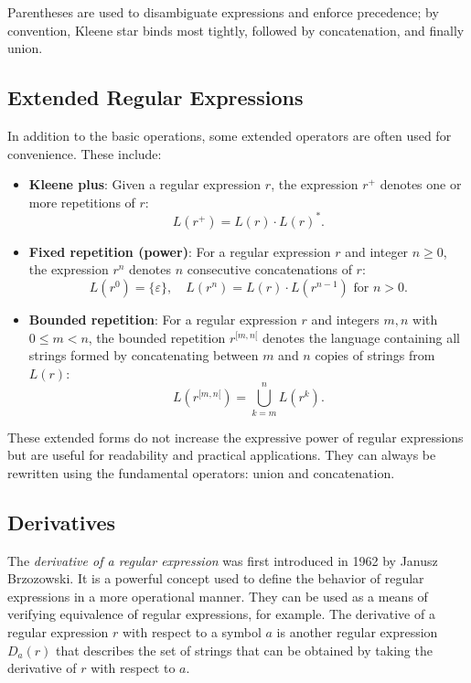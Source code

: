 \medskip

Parentheses are used to disambiguate expressions and enforce precedence; by convention, Kleene star binds most tightly, followed by concatenation, and finally union.

\subsection{Extended Regular Expressions}
In addition to the basic operations, some extended operators are often used for convenience. These include:

\begin{itemize}
    \item \textbf{Kleene plus}: Given a regular expression $r$, the expression $r^+$ denotes one or more repetitions of $r$:
    \[
    L(r^+) = L(r) \cdot L(r)^*.
    \]

    \item \textbf{Fixed repetition (power)}: For a regular expression $r$ and integer $n \geq 0$, the expression $r^n$ denotes $n$ consecutive concatenations of $r$:
    \[
    L(r^0) = \{ \varepsilon \}, \quad L(r^n) = L(r) \cdot L(r^{n-1}) \text{ for } n > 0.
    \]

	 \item \textbf{Bounded repetition}: For a regular expression $r$ and integers $m, n$ with $0 \leq m < n$, the bounded repetition $r^{[m,n[}$ denotes the language containing all strings formed by concatenating between $m$ and $n$ copies of strings from $L(r)$:
    \[
    L(r^{[m,n[}) = \bigcup_{k=m}^{n} L(r^k).
    \]
\end{itemize}

These extended forms do not increase the expressive power of regular expressions but are useful for readability and practical applications. They can always be rewritten using the fundamental operators: union and concatenation.

\subsection{Derivatives}
\label{chap:prelim:derivatives}
The \emph{derivative of a regular expression} was first introduced in 1962 by Janusz Brzozowski. It is a powerful concept used to define the behavior of regular expressions in a more operational manner. They can be used as a means of verifying equivalence of regular expressions, for example. The derivative of a regular expression $r$ with respect to a symbol $a$ is another regular expression $D_a(r)$ that describes the set of strings that can be obtained by taking the derivative of $r$ with respect to $a$.


